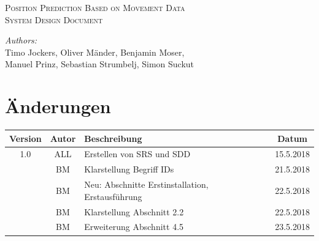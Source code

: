 \documentclass[12pt]{article} %
\begin{document}


\begin{titlepage}

\newcommand{\HRule}{\rule{\linewidth}{0.5mm}} %

\center %

\textsc{\Large Position Prediction Based on Movement Data}\\[0.5cm] %
\textsc{\large System Design Document}\\[0.5cm] %

\vfill

\emph{Authors:}\\
Timo Jockers, Oliver Mänder, Benjamin Moser, \\
Manuel Prinz, Sebastian Strumbelj, Simon Suckut

\vfill %

\end{titlepage}


\tableofcontents %

\newpage %


\section{Änderungen}


\begin{tabular}{|c|c|p{10cm}|c|}
\hline
Version & Autor & Beschreibung & Datum \\ \hline\hline

1.0 & ALL & Erstellen von SRS und SDD & 15.5.2018 \\\hline
	& BM  &	Klarstellung Begriff IDs  &	21.5.2018 \\\hline
	& BM  &	Neu: Abschnitte Erstinstallation, Erstausführung  &	22.5.2018 \\\hline
	& BM  &	Klarstellung Abschnitt 2.2  &	22.5.2018 \\\hline
	& BM  & Erweiterung Abschnitt 4.5   &   23.5.2018 \\\hline

\end{tabular}
\end{document}
